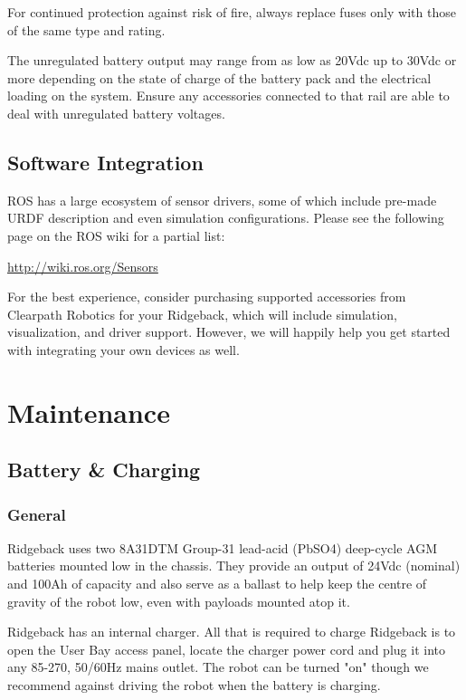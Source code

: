 \documentclass[]{clearpath-latex/clearpath-manual}
\begin{document}
\begin{warning}
For continued protection against risk of fire, always replace fuses only with those of the same type and rating.
\end{warning}

\begin{warning}
The unregulated battery output may range from as low as 20Vdc up to 30Vdc or more depending on the state of charge of the battery pack and the electrical loading on the system. Ensure any accessories connected to that rail are able to deal with unregulated battery voltages.
\end{warning}


\subsection{Software Integration}

ROS has a large ecosystem of sensor drivers, some of which include pre-made URDF description and even simulation configurations.  Please see the following page on the ROS wiki for a partial list:

\url{http://wiki.ros.org/Sensors}

For the best experience, consider purchasing supported accessories from Clearpath Robotics for your Ridgeback, which will include simulation, visualization, and driver support.  However, we will happily help you get started with integrating your own devices as well.

\section{Maintenance}

\subsection{Battery \& Charging}

\subsubsection{General}

Ridgeback uses two 8A31DTM Group-31 lead-acid (PbSO4) deep-cycle AGM batteries mounted low in the chassis. They provide an output of 24Vdc (nominal) and 100Ah of capacity and also serve as a ballast to help keep the centre of gravity of the robot low, even with payloads mounted atop it.

Ridgeback has an internal charger. All that is required to charge Ridgeback is to open the User Bay access panel, locate the charger power cord and plug it into any 85-270, 50/60Hz mains outlet. The robot can be turned "on" though we recommend against driving the robot when the battery is charging.
\end{document}
